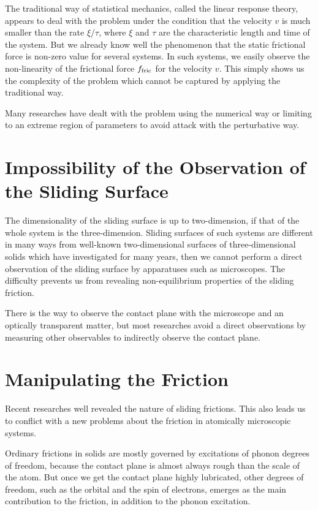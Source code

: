 The traditional way of statistical mechanics, called the linear response theory, appears to deal with the problem under the condition that the velocity $v$ is much smaller than the rate $\xi/\tau$, where $\xi$ and $\tau$ are the characteristic length and time of the system. But we already know well the phenomenon that the static frictional force is non-zero value for several systems. In such systems, we easily observe the non-linearity of the frictional force $f_{\rm fric}$ for the velocity $v$. This simply shows us the complexity of the problem which cannot be captured by applying the traditional way.

Many researches have dealt with the problem using the numerical way or limiting to an extreme region of parameters to avoid attack with the perturbative way.

\section{Impossibility of the Observation of the Sliding Surface}
The dimensionality of the sliding surface is up to two-dimension, if that of the whole system is the three-dimension. Sliding surfaces of such systems are different in many ways from well-known two-dimensional surfaces of three-dimensional solids which have investigated for many years, then we cannot perform a direct observation of the sliding surface by apparatuses such as microscopes. The difficulty prevents us from revealing non-equilibrium properties of the sliding friction.

There is the way to observe the contact plane with the microscope and an optically transparent matter, but most researches avoid a direct observations by measuring other observables to indirectly observe the contact plane.

\section{Manipulating the Friction}

Recent researches well revealed the nature of sliding frictions. This also leads us to conflict with a new problems about the friction in atomically microscopic systems.

Ordinary frictions in solids are mostly governed by excitations of phonon degrees of freedom, because the contact plane is almost always rough than the scale of the atom. But once we get the contact plane highly lubricated, other degrees of freedom, such as the orbital and the spin of electrons, emerges as the main contribution to the friction, in addition to the phonon excitation. 

